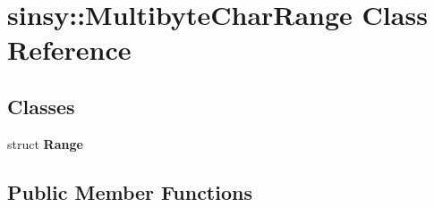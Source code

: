 \hypertarget{classsinsy_1_1MultibyteCharRange}{\section{sinsy\-:\-:\-Multibyte\-Char\-Range \-Class \-Reference}
\label{classsinsy_1_1MultibyteCharRange}
}
\subsection*{\-Classes}
\begin{DoxyCompactItemize}
\item 
struct {\bfseries \-Range}
\end{DoxyCompactItemize}
\subsection*{\-Public \-Member \-Functions}

